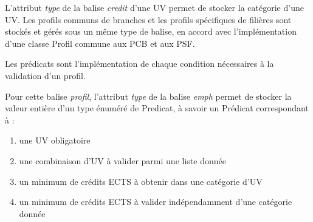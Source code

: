 \documentclass[a4paper,10pt,french]{report}
\begin{document}
	L'attribut \emph{type} de la balise \emph{credit} d'une UV permet de stocker la catégorie d'une UV.
	Les profils communs de branches et les profils spécifiques de filières sont stockés et gérés sous un même type de balise, en accord avec l'implémentation d'une classe Profil commune aux PCB et aux PSF.
	
	Les prédicats sont l'implémentation de chaque condition nécessaires à la validation d'un profil.
	
	
	Pour cette balise \emph{profil}, l'attribut \emph{type} de la balise \emph{emph} permet de stocker la valeur entière d'un type énuméré de Predicat, à savoir un Prédicat correspondant à :
	\begin{enumerate}
	\item une UV obligatoire
	\item une combinaison d'UV à valider parmi une liste donnée
	\item un minimum de crédits ECTS à obtenir dans une catégorie d'UV
	\item un minimum de crédits ECTS à valider indépendamment d'une catégorie donnée
	\end{enumerate}
	
	
		\subsubsection{}
			\paragraph{}
			\paragraph{}
			\paragraph{}
		\subsubsection{}
			\paragraph{}
			\paragraph{}
			\paragraph{}
\end{document}
